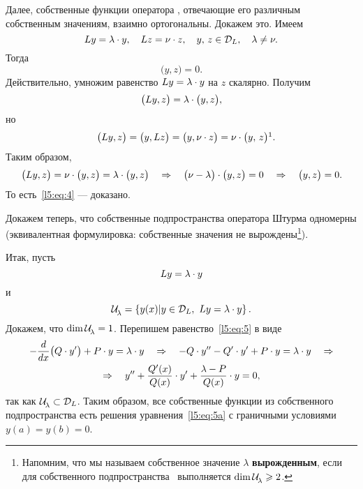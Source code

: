 Далее, собственные функции оператора \LL, отвечающие его различным собственным значениям, взаимно ортогональны. Докажем это. Имеем
\begin{equation*}
	L y=\lambda\cdot y,\quad L z=\nu\cdot z,\quad y,\,z\in\mathcal{D}_{L},\quad \lambda\neq\nu.
\end{equation*}   
Тогда 
\begin{equation}
	\label{l5:eq:4}
	 \big(y,z\big)=0.
\end{equation}
Действительно, умножим равенство $L y=\lambda\cdot y$ на $z$ скалярно. Получим
\begin{equation*}
	\big(L y,z\big)=\lambda\cdot\big(y,z\big),
\end{equation*}
но
\begin{equation*}
	\quad\big(\LL y,z\big)=\big(y,\LL z\big)=\big(y,\nu\cdot z\big)=\nu\cdot\big(y,\,z\big)\footnotemark{}.
\end{equation*}%
Таким образом{\mb,}
\begin{equation*}
	\big(L y,z\big)=\nu\cdot\big(y,z\big)=\lambda\cdot\big(y,z\big)\quad\Rightarrow\quad \big(\nu-\lambda\big)\cdot \big(y,z\big)=0\quad\Rightarrow\quad\big(y,z\big)=0.
\end{equation*}
То есть~\eqref{l5:eq:4} --- доказано.

Докажем теперь, что собственные подпространства оператора Штурма одномерны (эквивалентная формулировка: собственные значения не вырождены\footnote{Напомним, что мы называем собственное значение $\lambda$ \textbf{вырожденным}, если для собственного подпространства \Ul\ выполняется $\dim\mathcal{U}\!{\mathstrut}_{\lambda}\geqslant2$.}).

\noindent Итак, пусть 
\begin{equation}
	\label{l5:eq:5}
	L y=\lambda\cdot y
\end{equation}
и
\begin{equation*}
	\Ul=\left\{y(x)\middle|y\in\mc{D}_{\LL},\ Ly=\lambda\cdot y\right\}.
\end{equation*}
Докажем, что $\dim\mathcal{U}\!{\mathstrut}_{\lambda}=1$. Перепишем равенство~\eqref{l5:eq:5} в виде
\begin{multline}
	\label{l5:eq:5a}
	-\frac{d}{dx}\big(Q\cdot y'\big)+P\cdot y=\lambda\cdot y\quad\Rightarrow\quad-Q\cdot y''-Q'\cdot y'+P\cdot y=\lambda\cdot y\quad\Rightarrow\\\Rightarrow\quad y''+\frac{Q'(x)}{Q(x)}\cdot y'+\frac{\lambda-P}{Q(x)}\cdot y=0,
\end{multline}
 так как $\mathcal{U}\!{\mathstrut}_{\lambda}\subset\mathcal{D}_{L}$. Таким образом{\mb,} все собственные функции из собственного подпространства есть решения уравнения~\eqref{l5:eq:5a} с граничными условиями  $y(a)=y(b)=0$.

